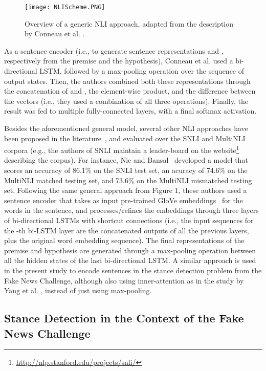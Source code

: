\begin{figure}[t]
  \begin{center}
  \texttt{[image: NLIScheme.PNG]}
  \caption{Overview of a generic NLI approach, adapted from the description by Conneau et al. \cite{supervised}.}
  \label{fig:nli}
  \end{center}
\end{figure}

As a sentence encoder (i.e., to generate sentence representations  and , respectively from the premise and the hypothesis), Conneau et al. used a bi-directional LSTM, followed by a max-pooling operation over the sequence of output states. Then, the authors combined both these representations through the concatenation of  and , the element-wise product, and the difference between the vectors (i.e., they used a combination of all three operations). Finally, the result was fed to multiple fully-connected layers, with a final softmax activation. 

Besides the aforementioned general model, several other NLI approaches have been proposed in the literature~\cite{shortcut,gong2017natural,chen2017enhanced}, and evaluated over the SNLI and MultiNLI corpora (e.g., the authors of SNLI maintain a leader-board on the website\footnote{\scriptsize{\url{http://nlp.stanford.edu/projects/snli/}}} describing the corpus). For instance, Nie and Bansal~\cite{shortcut} developed a model that scores an accuracy of 86.1\% on the SNLI test set, an acuracy of 74.6\% on the MultiNLI matched testing set, and 73.6\% on the MultiNLI mismatched testing set. Following the same general approach from Figure 1, these authors used a sentence encoder that takes as input pre-trained GloVe embeddings~\cite{glove} for the words in the sentence, and processes/refines the embeddings through three layers of bi-directional LSTMs with shortcut connections (i.e., the input sequences for the -th bi-LSTM layer are the concatenated outputs of all the previous layers, plus the original word embedding sequence). The final representations of the premise and hypothesis are generated through a max-pooling operation between all the hidden states of the last bi-directional LSTM. A similar approach is used in the present study to encode sentences in the stance detection problem from the Fake News Challenge, although also using inner-attention as in the study by Yang et al. \cite{hierarchical}, instead of just using max-pooling.

\subsection{Stance Detection in the Context of the Fake News Challenge}

